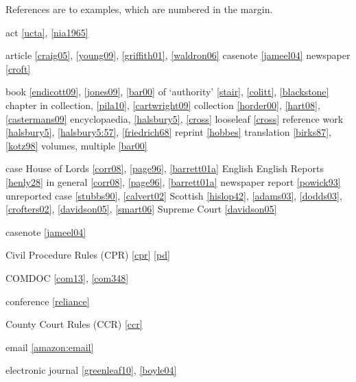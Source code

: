 \documentclass[a5paper,fontsize=9pt,DIV=1]{scrartcl}
\begin{document}
\clearpage
{}
{\def\indexname{Table of Examples}

\begin{theindex}

References are to examples, which are numbered in the margin.
\bigskip
\item act \ref{ucta}, \ref{nia1965}
\item article \ref{craig05}, \ref{young09}, \ref{griffith01}, \ref{waldron06}
\subitem casenote \ref{jameel04}
\subitem newspaper \ref{croft}
\item book \ref{endicott09}, \ref{jones09}, \ref{bar00}
  \subitem of `authority' \ref{stair}, \ref{colitt}, \ref{blackstone}
  \subitem chapter in collection, \ref{pila10}, \ref{cartwright09}
  \subitem collection \ref{horder00}, \ref{hart08}, \ref{castermans09}
  \subitem encyclopaedia, \ref{halsbury5}, \ref{cross}
  \subitem looseleaf \ref{cross}
  \subitem reference work \ref{halsbury5}, \ref{halsbury5:57}, \ref{friedrich68}
  \subitem reprint \ref{hobbes}
  \subitem translation \ref{birks87}, \ref{kotz98}
  \subitem volumes, multiple \ref{bar00}

\item case
 \subitem House of Lords \ref{corr08}, \ref{page96}, \ref{barrett01a}
 \subitem English
   \subsubitem English Reports \ref{henly28}
   \subsubitem in general \ref{corr08}, \ref{page96}, \ref{barrett01a}
   \subsubitem newspaper report \ref{powick93}
   \subsubitem unreported case \ref{stubbs90}, \ref{calvert02}
 \subitem Scottish \ref{hislop42}, \ref{adams03}, \ref{dodds03},
    \ref{crofters02}, \ref{davidson05}, \ref{smart06}
 \subitem Supreme Court \ref{davidson05}

\item{casenote} \ref{jameel04}

\item Civil Procedure Rules (CPR) \ref{cpr} \ref{pd}

\item COMDOC \ref{com13}, \ref{com348}

\item conference \ref{reliance}

\item County Court Rules (CCR) \ref{ccr}

\item email \ref{amazon:email}

\item electronic journal \ref{greenleaf10}, \ref{boyle04}


\end{theindex}}
\end{document}
